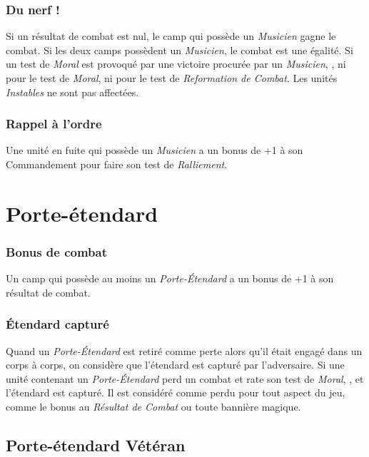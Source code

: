 \subsubsection*{Du nerf !}

Si un résultat de combat est nul, le camp qui possède un \emph{Musicien} gagne le combat. Si les deux camps possèdent un \emph{Musicien}, le combat est une égalité. Si un test de \emph{Moral} est provoqué par une victoire procurée par un \emph{Musicien}, , ni pour le test de \emph{Moral}, ni pour le test de \emph{Reformation de Combat}. Les unités \emph{Instables} ne sont pas affectées.

\subsubsection*{Rappel à l'ordre}

Une unité en fuite qui possède un \emph{Musicien} a un bonus de +1 à son Commandement pour faire son test de \emph{Ralliement}.

\section{Porte-étendard}

\subsubsection*{Bonus de combat}

Un camp qui possède au moins un \emph{Porte-Étendard} a un bonus de +1 à son résultat de combat.

\subsubsection*{Étendard capturé}

Quand un \emph{Porte-Étendard} est retiré comme perte alors qu'il était engagé dans un corps à corps, on considère que l'étendard est capturé par l'adversaire. Si une unité contenant un \emph{Porte-Étendard} perd un combat et rate son test de \emph{Moral}, , et l'étendard est capturé. Il est considéré comme perdu pour tout aspect du jeu, comme le bonus au \emph{Résultat de Combat} ou toute bannière magique.

\subsection{Porte-étendard Vétéran}

